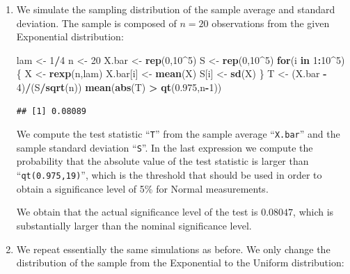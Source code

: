 \documentclass[]{krantz}
\makeatletter
\newenvironment{Shaded}{\begin{snugshade}}{\end{snugshade}}
\newcommand{\KeywordTok}[1]{\textcolor[rgb]{0.13,0.29,0.53}{\textbf{#1}}}
\newcommand{\DecValTok}[1]{\textcolor[rgb]{0.00,0.00,0.81}{#1}}
\newcommand{\FloatTok}[1]{\textcolor[rgb]{0.00,0.00,0.81}{#1}}
\newcommand{\StringTok}[1]{\textcolor[rgb]{0.31,0.60,0.02}{#1}}
\newcommand{\ControlFlowTok}[1]{\textcolor[rgb]{0.13,0.29,0.53}{\textbf{#1}}}
\newcommand{\OperatorTok}[1]{\textcolor[rgb]{0.81,0.36,0.00}{\textbf{#1}}}
\newcommand{\NormalTok}[1]{#1}
\newenvironment{kframe}{%
\medskip{}
\setlength{\fboxsep}{.8em}
 \def\at@end@of@kframe{}%
 \ifinner\ifhmode%
  \def\at@end@of@kframe{\end{minipage}}%
  \begin{minipage}{\columnwidth}%
 \fi\fi%
 \def\FrameCommand##1{\hskip\@totalleftmargin \hskip-\fboxsep
 \colorbox{shadecolor}{##1}\hskip-\fboxsep
     \hskip-\linewidth \hskip-\@totalleftmargin \hskip\columnwidth}%
 \MakeFramed {\advance\hsize-\width
   \@totalleftmargin\z@ \linewidth\hsize
   \@setminipage}}%
 {\par\unskip\endMakeFramed%
 \at@end@of@kframe}
\renewenvironment{Shaded}{\begin{kframe}}{\end{kframe}}
\theoremstyle{definition}
\theoremstyle{definition}
\theoremstyle{definition}
\theoremstyle{remark}
\makeatother
\begin{document}
\begin{enumerate}
\def\labelenumi{\arabic{enumi}.}
\item
  We simulate the sampling distribution of the sample average and
  standard deviation. The sample is composed of \(n=20\) observations
  from the given Exponential distribution:

\begin{Shaded}
\begin{Highlighting}[]
\NormalTok{lam <-}\StringTok{ }\DecValTok{1}\OperatorTok{/}\DecValTok{4}
\NormalTok{n <-}\StringTok{ }\DecValTok{20}
\NormalTok{X.bar <-}\StringTok{ }\KeywordTok{rep}\NormalTok{(}\DecValTok{0}\NormalTok{,}\DecValTok{10}\OperatorTok{^}\DecValTok{5}\NormalTok{)}
\NormalTok{S <-}\StringTok{ }\KeywordTok{rep}\NormalTok{(}\DecValTok{0}\NormalTok{,}\DecValTok{10}\OperatorTok{^}\DecValTok{5}\NormalTok{)}
\ControlFlowTok{for}\NormalTok{(i }\ControlFlowTok{in} \DecValTok{1}\OperatorTok{:}\DecValTok{10}\OperatorTok{^}\DecValTok{5}\NormalTok{) \{}
\NormalTok{  X <-}\StringTok{ }\KeywordTok{rexp}\NormalTok{(n,lam)}
\NormalTok{  X.bar[i] <-}\StringTok{ }\KeywordTok{mean}\NormalTok{(X)}
\NormalTok{  S[i] <-}\StringTok{ }\KeywordTok{sd}\NormalTok{(X)}
\NormalTok{\}}
\NormalTok{T <-}\StringTok{ }\NormalTok{(X.bar }\OperatorTok{-}\StringTok{ }\DecValTok{4}\NormalTok{)}\OperatorTok{/}\NormalTok{(S}\OperatorTok{/}\KeywordTok{sqrt}\NormalTok{(n))}
\KeywordTok{mean}\NormalTok{(}\KeywordTok{abs}\NormalTok{(T) }\OperatorTok{>}\StringTok{ }\KeywordTok{qt}\NormalTok{(}\FloatTok{0.975}\NormalTok{,n}\OperatorTok{-}\DecValTok{1}\NormalTok{))}
\end{Highlighting}
\end{Shaded}

\begin{verbatim}
## [1] 0.08089
\end{verbatim}

  We compute the test statistic ``\texttt{T}'' from the sample average
  ``\texttt{X.bar}'' and the sample standard deviation ``\texttt{S}''.
  In the last expression we compute the probability that the absolute
  value of the test statistic is larger than ``\texttt{qt(0.975,19)}'',
  which is the threshold that should be used in order to obtain a
  significance level of 5\% for Normal measurements.

  We obtain that the actual significance level of the test is
  \(0.08047\), which is substantially larger than the nominal
  significance level.
\item
  We repeat essentially the same simulations as before. We only change
  the distribution of the sample from the Exponential to the Uniform
  distribution:


\end{enumerate}
\end{document}
